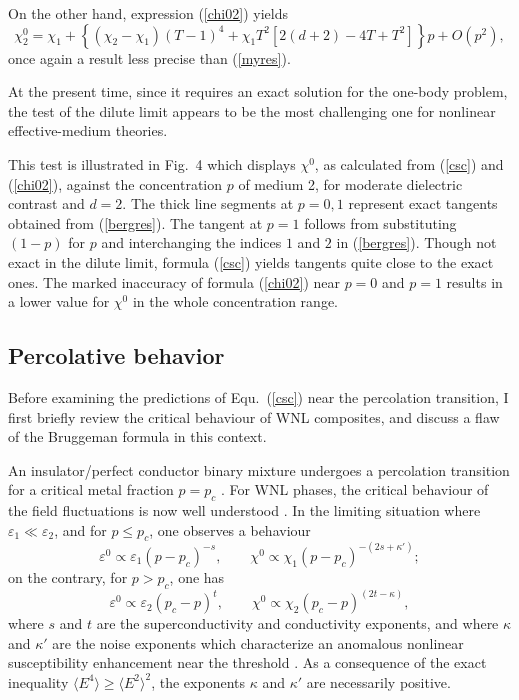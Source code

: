 On the other hand, expression (\ref{chi02}) yields
\begin{equation}
\chi^0_2=\chi_1+\left\{(\chi_2-\chi_1) (T-1)^4+
\chi_1T^2\left[2(d+2)-4T+T^2\right]\right\}p+O(p^2),
\end{equation}
once again a result less precise than (\ref{myres}).

At the present time, since it requires an exact solution for
the one-body problem, the test of the dilute limit appears to be
the most challenging one for nonlinear effective-medium theories.

This test is illustrated in Fig.\ 4 which displays $\chi^0$, as
calculated from (\ref{csc}) and (\ref{chi02}), against the
concentration $p$ of medium 2, for moderate dielectric contrast
and $d=2$. The thick line segments at $p=0,1$ represent exact
tangents obtained from (\ref{bergres}). The tangent at $p=1$
follows from substituting $(1-p)$ for $p$ and interchanging the
indices $1$ and $2$ in (\ref{bergres}). Though not exact in the
dilute limit, formula (\ref{csc}) yields tangents quite close to
the exact ones. The marked inaccuracy of formula (\ref{chi02})
near $p=0$ and $p=1$ results in a lower value for $\chi^0$ in
the whole concentration range.

\subsection{Percolative behavior}
Before examining the predictions of Equ.\ (\ref{csc}) near the
percolation transition, I first briefly review the critical
behaviour of WNL composites, and discuss a flaw of the
Bruggeman formula in this context.

An insulator/perfect conductor binary mixture undergoes a
percolation transition for a critical metal fraction
$p=p_c$ \cite{CLER90}. For WNL phases, the critical behaviour
of the field fluctuations is now well understood
\cite{WRIG86}. In the limiting situation where
$\varepsilon_1\ll \varepsilon_2$, and for $p\leq p_c$,
one observes a behaviour
\begin{equation}
\varepsilon^0\propto \varepsilon_1(p-p_c)^{-s},
\qquad\chi^0\propto \chi_1(p-p_c)^{-(2s+\kappa')};
\end{equation}
on the contrary, for $p>p_c$, one has
\begin{equation}
\varepsilon^0\propto \varepsilon_2(p_c-p)^{t},\qquad\chi^0
\propto \chi_2(p_c-p)^{(2t-\kappa)},
\end{equation}
where $s$ and $t$ are the superconductivity and conductivity
exponents, and where $\kappa$ and $\kappa'$ are the noise
exponents which characterize an anomalous nonlinear
susceptibility enhancement near the threshold
\cite{RAMM85,WRIG86}. As a consequence of the exact
inequality $\langle E^4\rangle\ge\langle E^2\rangle^2$,
the exponents $\kappa$ and $\kappa'$ are necessarily
positive.

